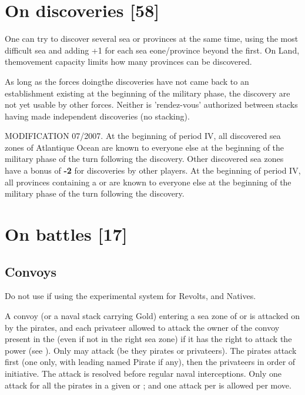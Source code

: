 \section{On discoveries [58]}\label{chMilitary:Discoveries}
\aparag One can try to discover several sea or provinces at the same time, using the most difficult
sea and adding +1 for each sea eone/province beyond the first. On Land, themovement capacity
limits how many provinces can be discovered.

\aparag As long as the forces doingthe discoveries have not came back to an establishment
existing at the beginning of the military phase, the discovery are not yet usable by other forces.
Neither is 'rendez-vous' authorized between stacks having made independent discoveries (no
stacking).

MODIFICATION 07/2007.
\bparag[On sea] At the beginning of period IV, all discovered sea zones of Atlantique
Ocean are known to everyone else at the beginning of the military phase of the turn following the discovery. Other discovered sea zones have a bonus of {\bf -2} for discoveries by other players.
\bparag [On land] At the beginning of period IV, all provinces containing a \COL or \TP are known to
everyone else at the beginning of the military phase of the turn following the discovery.



\section{On battles [17]}

\subsection{Convoys}\label{chMilitary:Convoys}
Do not use if using the experimental system for Revolts, \corsaire and Natives.

A convoy (or a naval stack carrying Gold)
entering a sea zone of \STZ or \CTZ is attacked on
 by the pirates, and each
privateer allowed to attack the owner of the convoy present in the \STZ
(even if not in the right sea zone) if it has the right to attack the
power (see ).
\bparag Only \corsaire\faceplus may attack (be they pirates or
privateers).
\bparag The pirates attack first (one only, with leading
named Pirate if any), then the privateers in order of initiative. The
attack is resolved before regular naval interceptions.
\bparag Only one attack for all the pirates in a given \STZ or \CTZ; and
one attack per \corsaire is allowed per move.

